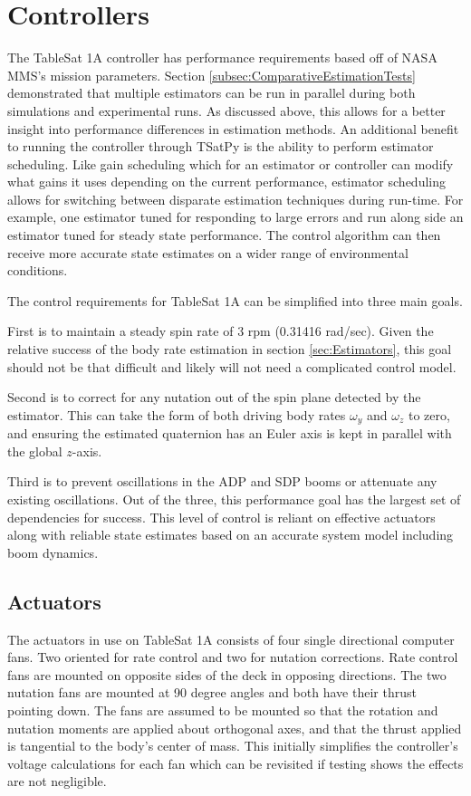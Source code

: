 \section{Controllers}
\label{sec:Controller}

The TableSat 1A controller has performance requirements based off of NASA MMS's mission parameters.  Section \ref{subsec:ComparativeEstimationTests} demonstrated that multiple estimators can be run in parallel during both simulations and experimental runs.  As discussed above, this allows for a better insight into performance differences in estimation methods.  An additional benefit to running the controller through TSatPy is the ability to perform estimator scheduling.  Like gain scheduling which for an estimator or controller can modify what gains it uses depending on the current performance, estimator scheduling allows for switching between disparate estimation techniques during run-time.  For example, one estimator tuned for responding to large errors and run along side an estimator tuned for steady state performance.  The control algorithm can then receive more accurate state estimates on a wider range of environmental conditions.

The control requirements for TableSat 1A can be simplified into three main goals.

First is to maintain a steady spin rate of 3 rpm (0.31416 rad/sec).  Given the relative success of the body rate estimation in section \ref{sec:Estimators}, this goal should not be that difficult and likely will not need a complicated control model.

Second is to correct for any nutation out of the spin plane detected by the estimator.  This can take the form of both driving body rates $\omega_y$ and $\omega_z$ to zero, and ensuring the estimated quaternion has an Euler axis is kept in parallel with the global $z$-axis.

Third is to prevent oscillations in the ADP and SDP booms or attenuate any existing oscillations.  Out of the three, this performance goal has the largest set of dependencies for success.  This level of control is reliant on effective actuators along with reliable state estimates based on an accurate system model including boom dynamics.

\subsection{Actuators}
\label{subsec:Actuators}

The actuators in use on TableSat 1A consists of four single directional computer fans.  Two oriented for rate control and two for nutation corrections.  Rate control fans are mounted on opposite sides of the deck in opposing directions.  The two nutation fans are mounted at 90 degree angles and both have their thrust pointing down.  The fans are assumed to be mounted so that the rotation and nutation moments are applied about orthogonal axes, and that the thrust applied is tangential to the body's center of mass.  This initially simplifies the controller's voltage calculations for each fan which can be revisited if testing shows the effects are not negligible.

